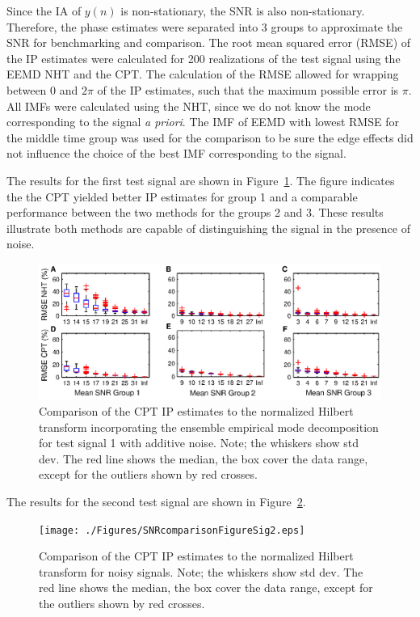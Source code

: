 \documentclass[journal,11pt,a4paper,onecolumn,draftcls]{IEEEtran}
\begin{document}
Since the IA of $y(n)$ is non-stationary, the SNR is also non-stationary. Therefore, the phase estimates were separated into $3$ groups to approximate the SNR for benchmarking and comparison. The root mean squared error (RMSE) of the IP estimates were calculated for 200 realizations of the test signal using the EEMD NHT and the CPT. The calculation of the RMSE allowed for wrapping between $0$ and $2\pi$ of the IP estimates, such that the maximum possible error is $\pi$. All IMFs were calculated using the NHT, since we do not know the mode corresponding to the signal \emph{a priori}. The IMF of EEMD with lowest RMSE for the middle time group was used for the comparison to be sure the edge effects did not influence the choice of the best IMF corresponding to the signal. 

The results for the first test signal are shown in Figure~\ref{fig:RMSEComparison}. The figure indicates the the CPT yielded better IP estimates for group 1 and a comparable performance between the two methods for the groups 2 and 3. These results illustrate both methods are capable of distinguishing the signal in the presence of noise.
\begin{figure}[!ht]\label{fig:RMSEComparison}
    \centering
        \includegraphics[scale=1]{./Figures/SNRcomparisonFigure.eps}
    \caption{Comparison of the CPT IP estimates to the normalized Hilbert transform incorporating the ensemble empirical mode decomposition for test signal 1 with additive noise. Note; the whiskers show std dev. The red line shows the median, the box cover the data range, except for the outliers shown by red crosses.}
\end{figure}

The results for the second test signal are shown in Figure~\ref{fig:RMSEComparisonSig2}. 
\begin{figure}[!ht]\label{fig:RMSEComparisonSig2}
    \centering
        \texttt{[image: ./Figures/SNRcomparisonFigureSig2.eps]}
    \caption{Comparison of the CPT IP estimates to the normalized Hilbert transform for noisy signals. Note; the whiskers show std dev. The red line shows the median, the box cover the data range, except for the outliers shown by red crosses.}
\end{figure}
\end{document}

